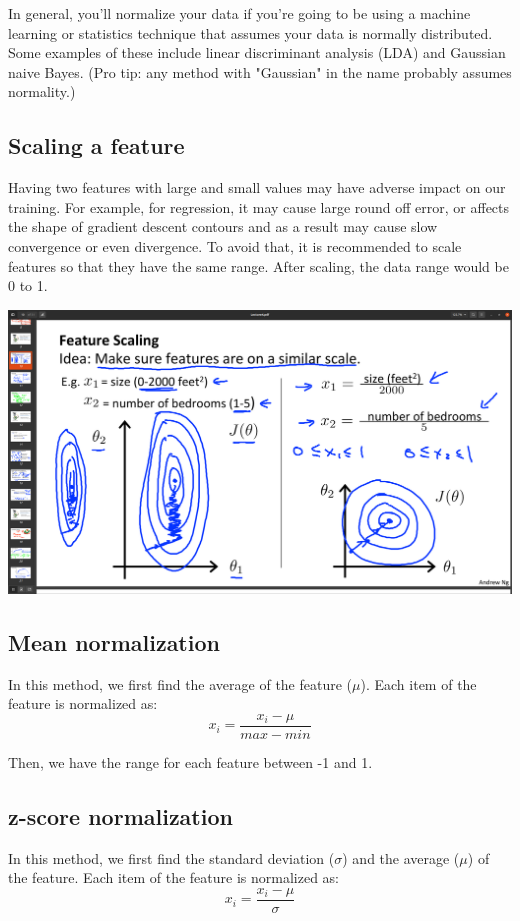 \documentclass[12pt]{report}
\begin{document}
In general, you'll normalize your data if you're going to be using a machine learning or statistics technique that assumes your data is normally distributed. Some examples of these include linear discriminant analysis (LDA) and Gaussian naive Bayes. (Pro tip: any method with "Gaussian" in the name probably assumes normality.)

\subsection{Scaling a feature}
Having two features with large and small values may have adverse impact on our training. For example, for regression, it may cause large round off error, or affects the shape of gradient descent contours and as a result may cause slow convergence or even divergence. To avoid that, it is recommended to scale features so that they have the same range. After scaling, the data range would be 0 to 1.

\includegraphics[scale=0.12]{pics/scalingforGD.png}

\subsection{Mean normalization}
In this method, we first find the average of the feature ($\mu$). Each item of the feature is normalized as:
\begin{equation}
  x_i = \frac{x_i-\mu}{max-min}
\end{equation}

Then, we have the range for each feature between -1 and 1.

\subsection{z-score normalization}
In this method, we first find the standard deviation ($\sigma$) and the average ($\mu$) of the feature. Each item of the feature is normalized as:
\begin{equation}
  x_i = \frac{x_i-\mu}{\sigma}
\end{equation}
\end{document}

